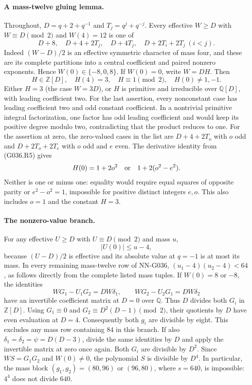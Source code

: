 \paragraph{A mass-twelve gluing lemma.}
Throughout, $D=q+2+q^{-1}$ and $T_j=q^j+q^{-j}$.
Every effective $W\ge D$ with $W\equiv D\pmod2$ and $W(4)=12$
is one of
\[
 D+8,\quad D+4+2T_j,\quad D+4T_j,\quad
 D+2T_i+2T_j\ (i<j).
\]
Indeed $(W-D)/2$ is an effective symmetric character of mass four,
and these are its complete partitions into a central coefficient
and paired nonzero exponents. Hence $W(0)\in\{-8,0,8\}$.
If $W(0)=0$, write $W=DH$. Then
\[
 H\in\mathbb Z[D],\quad H(4)=3,\quad H\equiv1\pmod2,
 \quad H(0)\ne1,-1.
\]
Either $H=3$ (the case $W=3D$), or $H$ is primitive and
irreducible over $\mathbb Q[D]$, with leading coefficient two.
For the last assertion, every nonconstant case has leading
coefficient two and odd constant coefficient. In a nontrivial
primitive integral factorization, one factor has odd leading
coefficient and would keep its positive degree modulo two,
contradicting that the product reduces to one.
For the assertion at zero, the zero-valued cases in the list are
$D+4+2T_o$ with $o$ odd and $D+2T_o+2T_e$ with $o$ odd and
$e$ even. The derivative identity from (G036.R5) gives
\[
 H(0)=1+2o^2\quad\hbox{or}\quad 1+2(o^2-e^2).
\]
Neither is one or minus one: equality would require equal
squares of opposite parity or $e^2-o^2=1$, impossible for
positive distinct integers $e,o$. This also includes $o=1$
and the constant $H=3$.

\paragraph{The nonzero-value branch.}
For any effective $U\ge D$ with $U\equiv D\pmod2$ and mass $u$,
\[
 |U(0)|\le u-4,
\]
because $(U-D)/2$ is effective and its absolute value at $q=-1$
is at most its mass. In every remaining mass-twelve row of
NN-G036, $(u_1-4)(u_2-4)<64$, as follows directly from the
complete listed mass tuples. If $W(0)=8$ or $-8$, the identities
\[
 WG_1-U_1G_2=DW\delta_1,\qquad
 WG_2-U_2G_1=DW\delta_2
\]
have an invertible coefficient matrix at $D=0$ over $\mathbb Q$.
Thus $D$ divides both $G_i$ in $\mathbb Z[D]$.
Using $G_1\equiv0$ and $G_2\equiv D^2(D-1)\pmod2$, their
quotients by $D$ have even evaluation at $D=4$. Consequently
both $g_i$ are divisible by eight. This excludes any mass row
containing $84$ in this branch.
If also $\delta_1=\delta_2=\psi=D(D-3)$, divide the same
identities by $D$ and apply the invertible matrix at zero once
again. Both $G_i$ are divisible by $D^2$. Since $WS=G_1G_2$
and $W(0)\ne0$, the polynomial $S$ is divisible by $D^4$.
In particular, the mass block $(g_1,g_2)=(80,96)$ or $(96,80)$,
where $s=640$, is impossible: $4^4$ does not divide $640$.


